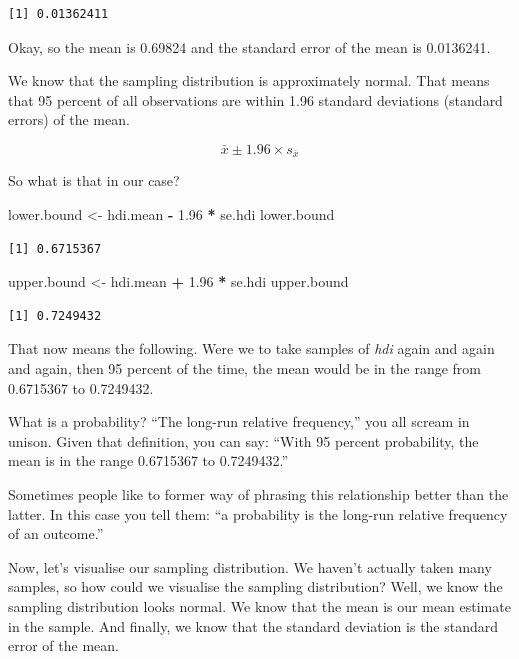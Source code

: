 \documentclass[]{book}
\newenvironment{Shaded}{\begin{snugshade}}{\end{snugshade}}
\newcommand{\FloatTok}[1]{\textcolor[rgb]{0.00,0.00,0.81}{#1}}
\newcommand{\StringTok}[1]{\textcolor[rgb]{0.31,0.60,0.02}{#1}}
\newcommand{\OperatorTok}[1]{\textcolor[rgb]{0.81,0.36,0.00}{\textbf{#1}}}
\newcommand{\NormalTok}[1]{#1}
\theoremstyle{definition}
\theoremstyle{definition}
\theoremstyle{definition}
\theoremstyle{remark}
\begin{document}
\begin{verbatim}
[1] 0.01362411
\end{verbatim}

Okay, so the mean is 0.69824 and the standard error of the mean is
0.0136241.

We know that the sampling distribution is approximately normal. That
means that 95 percent of all observations are within 1.96 standard
deviations (standard errors) of the mean.

\[ \bar{x} \pm 1.96 \times s_{\bar{x}} \]

So what is that in our case?

\begin{Shaded}
\begin{Highlighting}[]
\NormalTok{lower.bound <-}\StringTok{ }\NormalTok{hdi.mean }\OperatorTok{-}\StringTok{ }\FloatTok{1.96} \OperatorTok{*}\StringTok{ }\NormalTok{se.hdi}
\NormalTok{lower.bound}
\end{Highlighting}
\end{Shaded}

\begin{verbatim}
[1] 0.6715367
\end{verbatim}

\begin{Shaded}
\begin{Highlighting}[]
\NormalTok{upper.bound <-}\StringTok{ }\NormalTok{hdi.mean }\OperatorTok{+}\StringTok{ }\FloatTok{1.96} \OperatorTok{*}\StringTok{ }\NormalTok{se.hdi}
\NormalTok{upper.bound}
\end{Highlighting}
\end{Shaded}

\begin{verbatim}
[1] 0.7249432
\end{verbatim}

That now means the following. Were we to take samples of \emph{hdi}
again and again and again, then 95 percent of the time, the mean would
be in the range from 0.6715367 to 0.7249432.

What is a probability? ``The long-run relative frequency,'' you all
scream in unison. Given that definition, you can say: ``With 95 percent
probability, the mean is in the range 0.6715367 to 0.7249432.''

Sometimes people like to former way of phrasing this relationship better
than the latter. In this case you tell them: ``a probability is the
long-run relative frequency of an outcome.''

Now, let's visualise our sampling distribution. We haven't actually
taken many samples, so how could we visualise the sampling distribution?
Well, we know the sampling distribution looks normal. We know that the
mean is our mean estimate in the sample. And finally, we know that the
standard deviation is the standard error of the mean.
\end{document}
